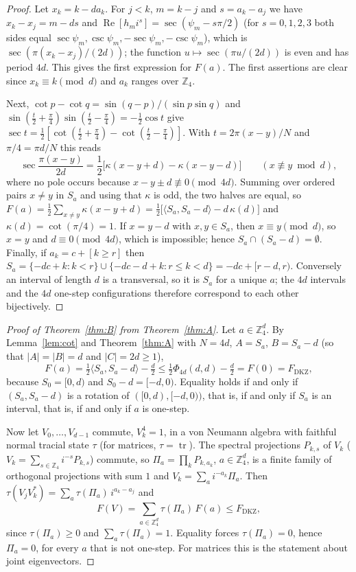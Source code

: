 \documentclass[11pt]{amsart}
\theoremstyle{definition}
\theoremstyle{remark}
\newcommand{\Z}{\mathbb{Z}}
\newcommand{\ip}[2]{\langle #1,#2\rangle}
\newcommand{\tr}{\operatorname{tr}}
\renewcommand{\Re}{\operatorname{Re}}
\newcommand{\FD}{F_{\mathrm{DKZ}}}
\begin{document}
\begin{proof}
Let $x_k=k-da_k$. For $j<k$, $m=k-j$ and $s=a_k-a_j$ we have $x_k-x_j=m-ds$ and
$\Re[h_mi^s]=\sec(\psi_m-s\pi/2)$ (for $s=0,1,2,3$ both sides equal $\sec\psi_m,\csc\psi_m,-\sec\psi_m,-\csc\psi_m$),
which is $\sec(\pi(x_k-x_j)/(2d))$; the function $u\mapsto\sec(\pi u/(2d))$ is even and has period $4d$. This
gives the first expression for $F(a)$. The first assertions are clear since $x_k\equiv k\pmod d$ and $a_k$ ranges
over $\Z_4$.

Next, $\cot p-\cot q=\sin(q-p)/(\sin p\sin q)$ and $\sin(\frac t2+\frac\pi4)\sin(\frac t2-\frac\pi4)=-\frac12\cos t$
give $\sec t=\frac12[\cot(\frac t2+\frac\pi4)-\cot(\frac t2-\frac\pi4)]$. With $t=2\pi(x-y)/N$ and $\pi/4=\pi d/N$
this reads
\[
\sec\frac{\pi(x-y)}{2d}=\frac12\bigl[\kappa(x-y+d)-\kappa(x-y-d)\bigr]\qquad(x\not\equiv y\bmod d),
\]
where no pole occurs because $x-y\pm d\not\equiv0\pmod{4d}$. Summing over ordered pairs $x\ne y$ in $S_a$ and using
that $\kappa$ is odd, the two halves are equal, so
$F(a)=\frac12\sum_{x\ne y}\kappa(x-y+d)=\frac12\bigl[\ip{S_a}{S_a-d}-d\,\kappa(d)\bigr]$ and $\kappa(d)=\cot(\pi/4)=1$.
If $x=y-d$ with $x,y\in S_a$, then $x\equiv y\pmod d$, so $x=y$ and $d\equiv0\pmod{4d}$, which is impossible; hence
$S_a\cap(S_a-d)=\emptyset$. Finally, if $a_k=c+[k\ge r]$ then
$S_a=\{-dc+k:k<r\}\cup\{-dc-d+k:r\le k<d\}=-dc+[r-d,r)$. Conversely an interval of length $d$ is a transversal, so it
is $S_a$ for a unique $a$; the $4d$ intervals and the $4d$ one-step configurations therefore correspond to each
other bijectively.
\end{proof}

\begin{proof}[Proof of Theorem~\ref{thm:B} from Theorem~\ref{thm:A}]
Let $a\in\Z_4^d$. By Lemma~\ref{lem:cot} and Theorem~\ref{thm:A} with $N=4d$, $A=S_a$, $B=S_a-d$ (so that
$|A|=|B|=d$ and $|C|=2d\ge1$),
\[
F(a)=\tfrac12\ip{S_a}{S_a-d}-\tfrac d2\le\tfrac12\Phi_{4d}(d,d)-\tfrac d2=F(0)=\FD ,
\]
because $S_0=[0,d)$ and $S_0-d=[-d,0)$. Equality holds if and only if $(S_a,S_a-d)$ is a rotation of $([0,d),[-d,0))$,
that is, if and only if $S_a$ is an interval, that is, if and only if $a$ is one-step.

Now let $V_0,\dots,V_{d-1}$ commute, $V_k^4=1$, in a von Neumann algebra with faithful normal tracial state $\tau$
(for matrices, $\tau=\tr$). The spectral projections $P_{k,s}$ of $V_k$ ($V_k=\sum_{s\in\Z_4}i^{-s}P_{k,s}$) commute,
so $\Pi_a=\prod_kP_{k,a_k}$, $a\in\Z_4^d$, is a finite family of orthogonal projections with sum $1$ and
$V_k=\sum_ai^{-a_k}\Pi_a$. Then $\tau(V_jV_k^*)=\sum_a\tau(\Pi_a)\,i^{a_k-a_j}$ and
\[
F(V)=\sum_{a\in\Z_4^d}\tau(\Pi_a)\,F(a)\le\FD ,
\]
since $\tau(\Pi_a)\ge0$ and $\sum_a\tau(\Pi_a)=1$. Equality forces $\tau(\Pi_a)=0$, hence $\Pi_a=0$, for every $a$
that is not one-step. For matrices this is the statement about joint eigenvectors.
\end{proof}
\end{document}
